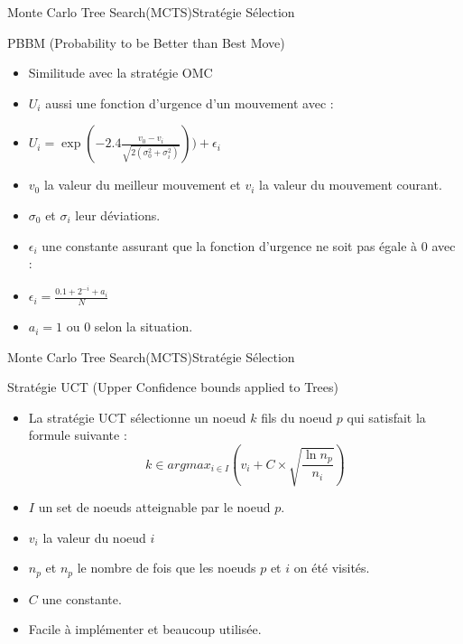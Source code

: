 \begin{frame}{Monte Carlo Tree Search(MCTS)}{Stratégie Sélection}
	\begin{block}{PBBM (Probability to be Better than Best Move)}
		\begin{itemize}
			\item Similitude avec la stratégie OMC
			\item $U_{i}$ aussi une fonction d'urgence d'un mouvement avec :
			\item $U_{i} = \exp(-2.4\frac{v_{0} - v_{i}}{\sqrt{2(\sigma_{0}^2 + \sigma_{i}^2)}})) + \epsilon_{i}$
			\item $v_{0}$ la valeur du meilleur mouvement et $v_{i}$ la valeur du mouvement courant.
			\item $\sigma_{0}$ et $\sigma_{i}$ leur déviations.
			\item $\epsilon_ {i}$ une constante assurant que la fonction d'urgence ne soit pas égale à 0 avec :
			\item $\epsilon_ {i} = \frac{0.1 + 2^{-i} + a_{i}}{N}$
			\item $a_{i} = 1$ ou $0$ selon la situation.
		\end{itemize}
	\end{block}
\end{frame}

\begin{frame}{Monte Carlo Tree Search(MCTS)}{Stratégie Sélection}
	\begin{block}{Stratégie UCT (Upper Confidence bounds applied to Trees)}
		\begin{itemize}
			\item La stratégie UCT sélectionne un noeud $k$ fils du noeud $p$ qui satisfait la formule suivante :
			$$k \in argmax_{i\in I}(v_{i} + C \times \sqrt{\frac{\ln n_{p}}{n_{i}}})$$
			\item $I$ un set de noeuds atteignable par le noeud $p$.
			\item $v_{i}$ la valeur du noeud $i$
			\item $n_{p}$ et $n_{p}$ le nombre de fois que les noeuds $p$ et $i$ on été visités.
			\item $C$ une constante.
			\item Facile à implémenter et beaucoup utilisée.
		\end{itemize}
	\end{block}
\end{frame}

